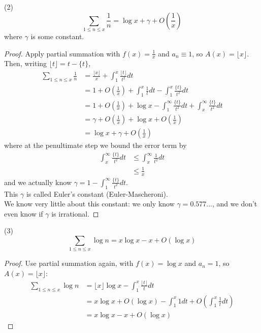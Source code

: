 \documentclass[a4paper]{article}
\begin{document}
\begin{lemma} (2)\\
$$\sum_{1 \leq n \leq x} \frac{1}{n} = \log x + \gamma + O\left(\frac{1}{x}\right)$$
where $\gamma$ is some constant.
\begin{proof}
Apply partial summation with $f(x)=\frac{1}{x}$ and $a_n \equiv 1$, so $A(x) = \lfloor x \rfloor$. Then, writing $\lfloor t \rfloor = t - \{t\}$,
\begin{equation*}
\begin{aligned}
\sum_{1 \leq n \leq x} \frac{1}{n} &= \frac{\lfloor x \rfloor}{x} + \int_1^x \frac{\lfloor t \rfloor}{t^2} dt\\
&= 1 + O\left(\frac{1}{x}\right) + \int_1^x \frac{1}{t} dt - \int_1^x \frac{\{t\}}{t^2} dt\\
&= 1+O\left(\frac{1}{x}\right) + \log x - \int_1^\infty \frac{\{t\}}{t^2} dt + \int_x^\infty \frac{\{t\}}{t^2} dt\\
&=\gamma + O\left(\frac{1}{x}\right) + \log x + O\left(\frac{1}{x}\right)\\
&= \log x + \gamma + O\left(\frac{1}{x}\right)
\end{aligned}
\end{equation*}
where at the penultimate step we bound the error term by 
\begin{equation*}
\begin{aligned}
\int_x^\infty \frac{\{t\}}{t^2} dt &\leq \int_x^\infty \frac{1}{t^2} dt\\
&\leq \frac{1}{x}
\end{aligned}
\end{equation*}
and we actually know $\gamma = 1 - \int_1^\infty \frac{\{t\}}{t^2} dt$.\\
This $\gamma$ is called Euler's constant (Euler-Mascheroni).\\
We know very little about this constant: we only know $\gamma=0.577...$, and we don't even know if $\gamma$ is irrational.
\end{proof}
\end{lemma}

\begin{lemma} (3)\\
$$\sum_{1 \leq n \leq x} \log n = x\log x - x + O(\log x)$$
\begin{proof}
Use partial summation again, with $f(x) = \log x$ and $a_n=1$, so $A(x) = \lfloor x \rfloor$:
\begin{equation*}
\begin{aligned}
\sum_{1 \leq n \leq x} \log n &= \lfloor x \rfloor \log x - \int_1^x \frac{\lfloor t \rfloor}{t} dt\\
&= x \log x + O(\log x) - \int_1^x 1 dt + O(\int_1^x \frac{1}{t} dt)\\
&= x\log x - x + O(\log x)
\end{aligned}
\end{equation*}
\end{proof}
\end{lemma}
\end{document}
